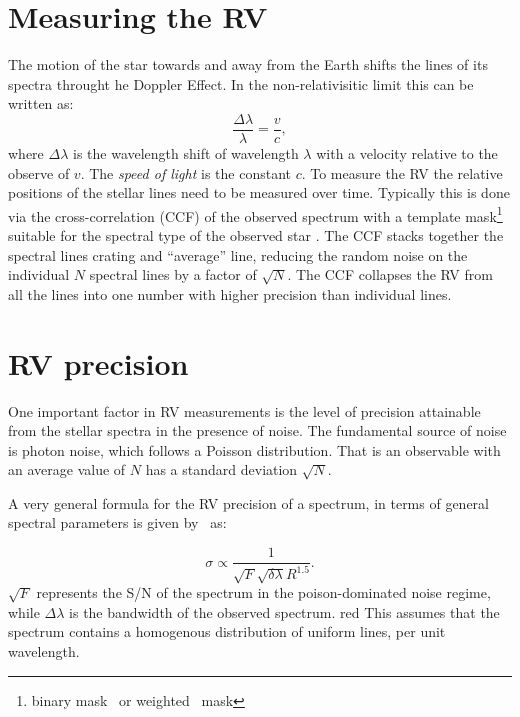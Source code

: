 


\section{Measuring the RV}
The motion of the star towards and away from the Earth shifts the lines of its spectra throught he Doppler Effect. In the non-relativisitic limit this can be written as:
\begin{equation}
\frac{\Delta\lambda}{\lambda} = \frac{v}{c},
\end{equation}
where $\Delta\lambda$ is the wavelength shift of wavelength $\lambda$ with a velocity relative to the observe of \(v\). The \emph{speed of light} is the constant $c$. 
To measure the RV the relative positions of the stellar lines need to be measured over time. Typically this is done via the cross-correlation (CCF) of the observed spectrum with a template mask\footnote{binary mask~\citep{baranne 1996} or weighted~\citep{pepe 2002} mask} suitable for the spectral type of the observed star \citep[e.g.][]{Baranne 1996, pepe 2002}. The {CCF} stacks together the spectral lines crating and ``average'' line, reducing the random noise on the individual $N$ spectral lines by a factor of $\sqrt{N}$. The {CCF} collapses the RV from all the lines into one number with higher precision than individual lines.


\section{RV precision}
\label{section:rv_precision}
One important factor in RV measurements is the level of precision attainable from the stellar spectra in the presence of noise. The fundamental source of noise is photon noise, which follows a Poisson distribution. That is an observable with an average value of $N$ has a standard deviation $\sqrt{N}$.



A very general formula for the RV precision of a spectrum, in terms of general spectral parameters is given by~\citet{hatzes_1992} as:

\begin{equation}
\sigma \propto \frac{1}{\sqrt{F} \sqrt{\delta \lambda} R^{1.5}}.
\end{equation}
$\sqrt{F}$ represents the S/N of the spectrum in the poison-dominated noise regime, while $\Delta \lambda$ is the bandwidth of the observed spectrum. {red{} This assumes that the spectrum contains a homogenous distribution of uniform lines, per unit wavelength. }


